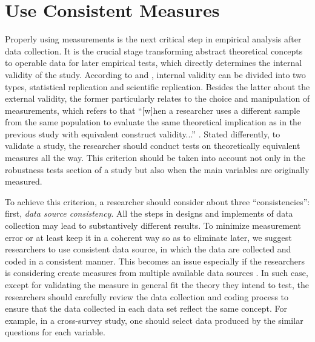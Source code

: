 
\section{Use Consistent Measures}
Properly using measurements is the next critical step in empirical analysis after data collection. It is the crucial stage transforming abstract theoretical concepts to operable data for later empirical tests, which directly determines the internal validity of the study. According to \cite{Hunter2001} and \cite{Hamermesh2007}, internal validity can be divided into two types, statistical replication and scientific replication. Besides the latter about the external validity, the former  particularly relates to the choice and manipulation of measurements, which refers to that ``[w]hen a researcher uses a different sample from the same population to evaluate the same theoretical implication as in the previous study with equivalent construct validity...'' \cite[258]{Morton2010}. Stated differently, to validate a study, the researcher should conduct tests on theoretically equivalent measures all the way. This criterion should be taken into account not only in the robustness tests section of a study but also when the main variables are originally measured. 

To achieve this criterion, a researcher should consider about three ``consistencies'': first, \textit{data source consistency}. All the steps in designs and implements of data collection may lead to substantively different results. To minimize measurement error or at least keep it in a coherent way so as to eliminate later, we suggest researchers to use consistent data source, in which the data are collected and coded in a consistent manner. This becomes an issue especially if the researchers is considering create measures from multiple available data sources . In such case, except for validating the measure in general fit the theory they intend to test, the researchers should carefully review the data collection and coding process to ensure that the data collected in each data set reflect the same concept. For example, in a cross-survey study, one should select data produced by the similar questions for each variable. 

